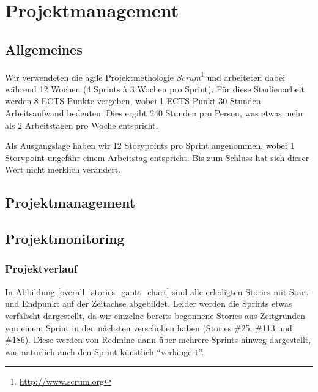 \chapter{Projektmanagement}
\label{projektmanagement}

\section{Allgemeines}
Wir verwendeten die agile Projektmethologie \emph{Scrum}\footnote{\url{http://www.scrum.org}} und arbeiteten dabei während 12 Wochen (4 Sprints à 3 Wochen pro Sprint).
Für diese Studienarbeit werden 8 ECTS-Punkte vergeben, wobei 1 ECTS-Punkt 30 Stunden Arbeitsaufwand bedeuten.
Dies ergibt 240 Stunden pro Person, was etwas mehr als 2 Arbeitstagen pro Woche entspricht.

Als Ausgangslage haben wir 12 Storypoints pro Sprint angenommen, wobei 1 Storypoint ungefähr einem Arbeitstag entspricht. Bis zum Schluss hat sich dieser Wert nicht merklich verändert.

\section{Projektmanagement}











\section{Projektmonitoring}

\subsection{Projektverlauf}
In Abbildung \ref{overall_stories_gantt_chart} sind alle erledigten Stories mit Start- und Endpunkt auf der Zeitachse abgebildet. Leider werden die Sprints etwas verfälscht dargestellt, da wir einzelne bereits begonnene Stories aus Zeitgründen von einem Sprint in den nächsten verschoben haben (Stories \#25, \#113 und \#186). Diese werden von Redmine dann über mehrere Sprints hinweg dargestellt, was natürlich auch den Sprint künstlich "`verlängert"'.

